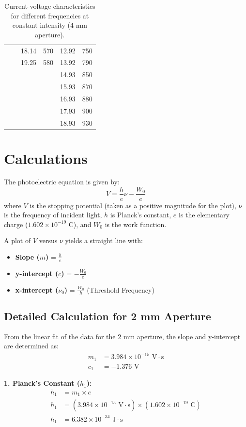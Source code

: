 \documentclass[12pt, a4paper]{article}
\begin{document}
\begin{table}[H]
\begin{tabular}{cc|cc|cc}
         &  & 18.14 & 570 & 12.92 & 750 \\
         &  & 19.25 & 580 & 13.92 & 790 \\
         &  &  &  & 14.93 & 850 \\
         &  &  &  & 15.93 & 870 \\
         &  &  &  & 16.93 & 880 \\
         &  &  &  & 17.93 & 900 \\
         &  &  &  & 18.93 & 930 \\
        \bottomrule
    \end{tabular}
    \caption{Current-voltage characteristics for different frequencies at constant intensity (4 mm aperture).}
\end{table}

\section{Calculations}
The photoelectric equation is given by:
\begin{equation}
    V = \frac{h}{e}\nu - \frac{W_0}{e}
\end{equation}
where $V$ is the stopping potential (taken as a positive magnitude for the plot), $\nu$ is the frequency of incident light, $h$ is Planck's constant, $e$ is the elementary charge ($1.602 \times 10^{-19}$ C), and $W_0$ is the work function.

A plot of $V$ versus $\nu$ yields a straight line with:
\begin{itemize}
    \item \textbf{Slope ($m$)} = $\frac{h}{e}$
    \item \textbf{y-intercept ($c$)} = $-\frac{W_0}{e}$
    \item \textbf{x-intercept ($\nu_0$)} = $\frac{W_0}{h}$ (Threshold Frequency)
\end{itemize}

\subsection*{Detailed Calculation for 2 mm Aperture}
From the linear fit of the data for the 2 mm aperture, the slope and y-intercept are determined as:
\begin{align*}
    m_1 &= 3.984 \times 10^{-15} \text{ V}\cdot\text{s} \\
    c_1 &= -1.376 \text{ V}
\end{align*}

\textbf{1. Planck's Constant ($h_1$):}
\begin{align*}
    h_1 &= m_1 \times e \\
    h_1 &= (3.984 \times 10^{-15} \text{ V}\cdot\text{s}) \times (1.602 \times 10^{-19} \text{ C}) \\
    h_1 &= 6.382 \times 10^{-34} \text{ J}\cdot\text{s}
\end{align*}
\end{document}
